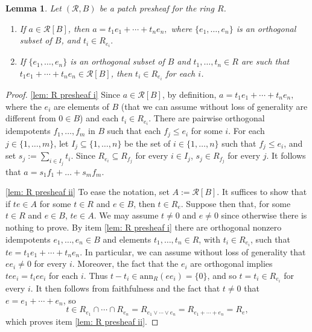 \documentclass[11pt]{amsart}
\newtheorem{lemma}[theorem]{Lemma}
\theoremstyle{definition}
\def\ann{\mathrm{ann}}
\def\cal{\mathcal}
\begin{document}
\begin{lemma}\label{lem: R presheaf} Let $({\cal R}, B)$ be a patch presheaf for the ring $R$.  
\begin{enumerate}[label=\textup{(\roman{*})}, mode=unboxed]
    \item\label{lem: R presheaf i} If $a \in {\cal R}[B] $, then $a =  t_1e_1+ \cdots + t_ne_n,$ where $\{e_1,\ldots,e_n\}$ is an orthogonal subset of $B$, and $t_i \in R_{e_i}.$
    \item\label{lem: R presheaf ii} If $\{e_1,\ldots,e_n\}$ is an orthogonal subset of $B$ and $t_1,\ldots,t_n \in R$ are such that $t_1e_1+\cdots +t_ne_n  \in {\cal R}[B] $, then $t_i \in R_{e_i}$ for each $i$. 
\end{enumerate}
\end{lemma}
\begin{proof} \ref{lem: R presheaf i} Since $a \in {\cal R}[B] $, by definition, $a = t_1e_1 + \cdots + t_ne_n,$ where the $e_i$ are elements of $B$ (that we can assume without loss of generality are  different from $0\in B$) and each $t_i \in R_{e_i}$. There are pairwise orthogonal idempotents $f_1,\ldots,f_m$ in $B$ such that each $f_j \leq e_i$ for some $i$. For each $j \in \{1,\ldots,m\}$, let $I_j\subseteq \{1, \dots, n\}$ be the set of $i\in \{1,\dots, n\}$ such that $f_j \leq e_i$, and set $s_j:=\sum_{i\in I_j}t_i$. Since $R_{e_i}\subseteq R_{f_j}$ for every $i\in I_j$, $s_j\in R_{f_j}$ for every $j$. It follows that $a=s_1f_1+\dots + s_m f_m$.

\ref{lem: R presheaf ii}  To ease the notation, set $A := {\cal R}[B] $. It suffices to show that if $te \in A$ for some $t \in R$ and $e \in B$, then $t \in R_e$. Suppose then that, for some $t\in R$ and $e\in B$, $te \in A$. We may assume $t \ne 0$ and $e \ne 0$ since otherwise there is nothing to prove. By item \ref{lem: R presheaf i} there are orthogonal nonzero idempotents $e_1,\ldots,e_n \in B$ and elements $t_1, \ldots, t_n\in R$, with $t_i\in R_{e_i}$, such that $te = t_1e_1 + \cdots + t_n e_n$. In particular, we can assume without loss of generality that $ee_i\ne 0$ for every $i$. Moreover, the fact that the $e_i$ are orthogonal implies $tee_i =t_i ee_i$ for each $i$. Thus $t - t_i \in \ann_R(ee_i)=\{0\}$, and so $t=t_i\in R_{e_i}$ for every $i$. It then follows from faithfulness and the fact that $t\ne0$ that $e=e_1+\cdots+e_n$, so $$t\in R_{e_1} \cap \cdots \cap R_{e_n} = R_{e_1 \vee \cdots \vee e_n} = R_{e_1 + \cdots + e_n}=R_e,$$ which proves item \ref{lem: R presheaf ii}. 
 \end{proof} 
 
\end{document}

